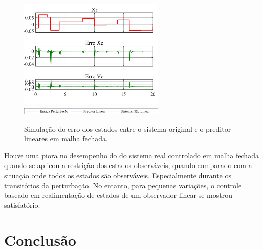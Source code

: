 \documentclass[a4paper]{ifacconf}
\begin{document}
    \FloatBarrier
    \begin{figure}[htbp]
        \begin{centering}
            \includegraphics[width=7cm]{img/simulaca_temporal_preditor_linear_erro.png}
            \includegraphics[width=7cm]{img/simulaca_temporal_preditor_linear_erro_leg.png}
            \caption{Simulação do erro dos estados entre o sistema original e o preditor lineares em malha fechada.}
            \label{fig:simulaca_temporal_preditor_linear_erro}
        \end{centering}
    \end{figure}
    \FloatBarrier

    Houve uma piora no desempenho do do sistema real controlado em malha fechada quando se aplicou a restrição dos estados observáveis, quando comparado com a situação onde todos os estados são observáveis. Especialmente durante os transitórios da perturbação. No entanto, para pequenas variações, o controle baseado em realimentação de estados de um observador linear se mostrou satisfatório.
    
    \section{Conclusão}
        
    
    
\end{document}
